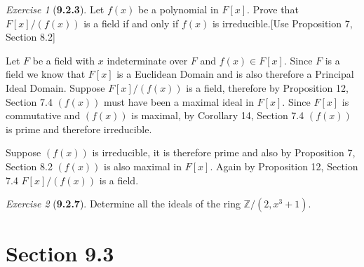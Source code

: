 \documentclass[12pt]{amsart}
\makeatletter
\theoremstyle{remark}
\newtheorem*{exercise}{Exercise}%
\def\ZZ{\ensuremath{\mathbb Z}}
\renewenvironment{proof}[1][\proofname]{\par\doublespacing
  \pushQED{\qed}%
  \normalfont \topsep6\p@\@plus6\p@\relax
  \list{}{%
    \settowidth{\leftmargin}{\itshape\proofname:\hskip\labelsep}%
    \setlength{\labelwidth}{0pt}%
    \setlength{\itemindent}{-\leftmargin}%
  }%
  \item[\hskip\labelsep\itshape#1\@addpunct{:}]\ignorespaces
}{%
  \popQED\endlist\@endpefalse
  \singlespacing
}
\theoremstyle{mycomment}
\makeatother
\begin{document}
\begin{exercise}[\textbf{9.2.3}] Let $f(x)$ be a polynomial in $F[x]$. Prove that $F[x]/(f(x))$ is a field if and only if $f(x)$
  is irreducible.[Use Proposition 7, Section 8.2]
  \begin{proof} Let $F$ be a field with $x$ indeterminate over $F$ and $f(x) \in F[x]$. Since $F$ is a field 
    we know that $F[x]$ is a Euclidean Domain and is also therefore a Principal Ideal Domain.
    Suppose $F[x]/(f(x))$ is a field, therefore by Proposition 12, Section 7.4 $(f(x))$ must have been a maximal ideal in $F[x]$.
    Since $F[x]$ is commutative and $(f(x))$ is maximal, by Corollary 14, Section 7.4 $(f(x))$ is prime and therefore irreducible. 

    Suppose $(f(x))$ is irreducible, it is therefore prime and also by Proposition 7, Section 8.2 $(f(x))$ is also maximal in $F[x]$.
    Again by Proposition 12, Section 7.4 $F[x]/(f(x))$ is a field. 
    \end{proof}
\end{exercise}
\vspace{.5in}


\begin{exercise}[\textbf{9.2.7}] Determine all the ideals of the ring $\ZZ/(2, x^3 + 1)$.
  \begin{proof} 
    \end{proof}
\end{exercise}
\vspace{.5in}





\section*{\textbf{Section 9.3}}
\end{document}
